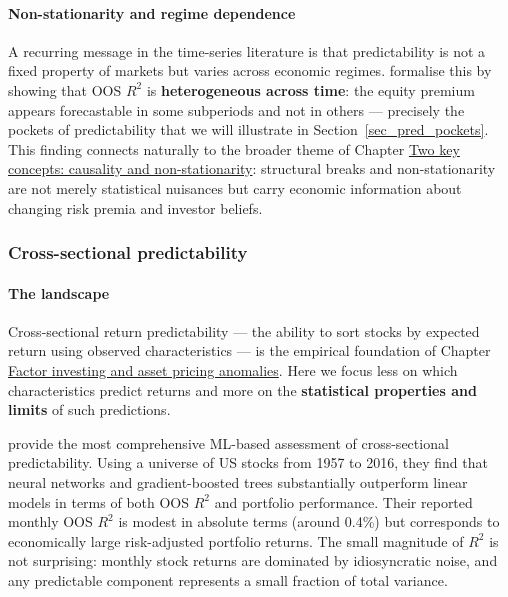 \paragraph{Non-stationarity and regime dependence}

A recurring message in the time-series literature is that predictability is not a fixed property of markets but varies across economic regimes. \cite{farmer2019pockets} formalise this by showing that OOS $R^2$ is \textbf{heterogeneous across time}: the equity premium appears forecastable in some subperiods and not in others --- precisely the pockets of predictability that we will illustrate in Section~\ref{sec_pred_pockets}. This finding connects naturally to the broader theme of Chapter \href{/chap-20-causality}{Two key concepts: causality and non-stationarity}: structural breaks and non-stationarity are not merely statistical nuisances but carry economic information about changing risk premia and investor beliefs.

\subsubsection{Cross-sectional predictability}\label{sec_pred_cs}

\paragraph{The landscape}

Cross-sectional return predictability --- the ability to sort stocks by expected return using observed characteristics --- is the empirical foundation of Chapter \href{/chap-03-asset-pricing}{Factor investing and asset pricing anomalies}. Here we focus less on which characteristics predict returns and more on the \textbf{statistical properties and limits} of such predictions.

\cite{gu2018empirical} provide the most comprehensive ML-based assessment of cross-sectional predictability. Using a universe of US stocks from 1957 to 2016, they find that neural networks and gradient-boosted trees substantially outperform linear models in terms of both OOS $R^2$ and portfolio performance. Their reported monthly OOS $R^2$ is modest in absolute terms (around 0.4\%) but corresponds to economically large risk-adjusted portfolio returns. The small magnitude of $R^2$ is not surprising: monthly stock returns are dominated by idiosyncratic noise, and any predictable component represents a small fraction of total variance.

